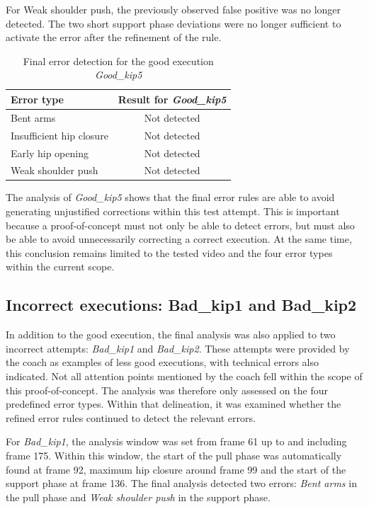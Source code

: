 For Weak shoulder push, the previously observed false positive was no longer detected. The two short support phase deviations were no longer sufficient to activate the error after the refinement of the rule.

\begin{table}[H]
    \centering
    \begin{tabular}{lc}
        \toprule
        \textbf{Error type} & \textbf{Result for \textit{Good\_kip5}} \\
        \midrule
        Bent arms & Not detected \\
        Insufficient hip closure & Not detected \\
        Early hip opening & Not detected \\
        Weak shoulder push & Not detected \\
        \bottomrule
    \end{tabular}
    \caption{Final error detection for the good execution \textit{Good\_kip5}}
    \label{tab:goodkip5_detection}
\end{table}

The analysis of \textit{Good\_kip5} shows that the final error rules are able to avoid generating unjustified corrections within this test attempt. This is important because a proof-of-concept must not only be able to detect errors, but must also be able to avoid unnecessarily correcting a correct execution. At the same time, this conclusion remains limited to the tested video and the four error types within the current scope.

\subsection{Incorrect executions: Bad\_kip1 and Bad\_kip2}

In addition to the good execution, the final analysis was also applied to two incorrect attempts: \textit{Bad\_kip1} and \textit{Bad\_kip2}. These attempts were provided by the coach as examples of less good executions, with technical errors also indicated. Not all attention points mentioned by the coach fell within the scope of this proof-of-concept. The analysis was therefore only assessed on the four predefined error types. Within that delineation, it was examined whether the refined error rules continued to detect the relevant errors.

For \textit{Bad\_kip1}, the analysis window was set from frame 61 up to and including frame 175. Within this window, the start of the pull phase was automatically found at frame 92, maximum hip closure around frame 99 and the start of the support phase at frame 136. The final analysis detected two errors: \textit{Bent arms} in the pull phase and \textit{Weak shoulder push} in the support phase.

